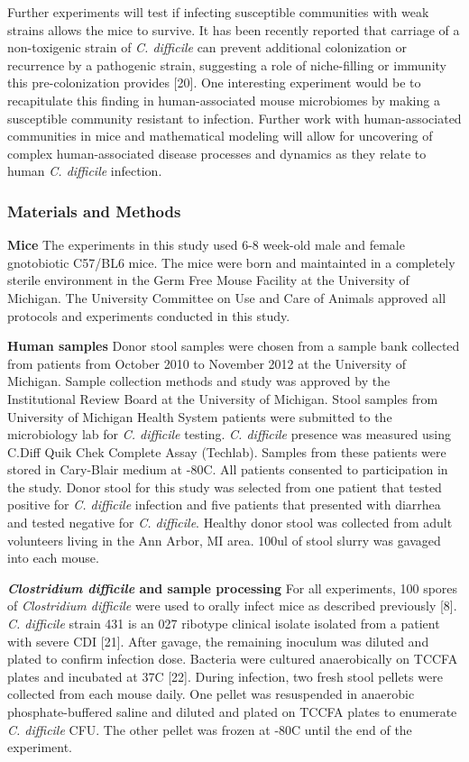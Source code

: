 \documentclass[11pt,]{article}
\begin{document}
Further experiments will test if infecting susceptible communities with
weak strains allows the mice to survive. It has been recently reported
that carriage of a non-toxigenic strain of \emph{C. difficile} can
prevent additional colonization or recurrence by a pathogenic strain,
suggesting a role of niche-filling or immunity this pre-colonization
provides {[}20{]}. One interesting experiment would be to recapitulate
this finding in human-associated mouse microbiomes by making a
susceptible community resistant to infection. Further work with
human-associated communities in mice and mathematical modeling will
allow for uncovering of complex human-associated disease processes and
dynamics as they relate to human \emph{C. difficile} infection.

\subsubsection{Materials and Methods}\label{materials-and-methods}

\textbf{Mice} The experiments in this study used 6-8 week-old male and
female gnotobiotic C57/BL6 mice. The mice were born and maintainted in a
completely sterile environment in the Germ Free Mouse Facility at the
University of Michigan. The University Committee on Use and Care of
Animals approved all protocols and experiments conducted in this study.

\textbf{Human samples} Donor stool samples were chosen from a sample
bank collected from patients from October 2010 to November 2012 at the
University of Michigan. Sample collection methods and study was approved
by the Institutional Review Board at the University of Michigan. Stool
samples from University of Michigan Health System patients were
submitted to the microbiology lab for \emph{C. difficile} testing.
\emph{C. difficile} presence was measured using C.Diff Quik Chek
Complete Assay (Techlab). Samples from these patients were stored in
Cary-Blair medium at -80C. All patients consented to participation in
the study. Donor stool for this study was selected from one patient that
tested positive for \emph{C. difficile} infection and five patients that
presented with diarrhea and tested negative for \emph{C. difficile}.
Healthy donor stool was collected from adult volunteers living in the
Ann Arbor, MI area. 100ul of stool slurry was gavaged into each mouse.

\textbf{\emph{Clostridium difficile} and sample processing} For all
experiments, 100 spores of \emph{Clostridium difficile} were used to
orally infect mice as described previously {[}8{]}. \emph{C. difficile}
strain 431 is an 027 ribotype clinical isolate isolated from a patient
with severe CDI {[}21{]}. After gavage, the remaining inoculum was
diluted and plated to confirm infection dose. Bacteria were cultured
anaerobically on TCCFA plates and incubated at 37C {[}22{]}. During
infection, two fresh stool pellets were collected from each mouse daily.
One pellet was resuspended in anaerobic phosphate-buffered saline and
diluted and plated on TCCFA plates to enumerate \emph{C. difficile} CFU.
The other pellet was frozen at -80C until the end of the experiment.
\end{document}
